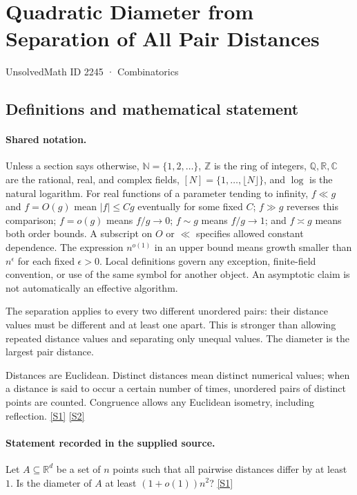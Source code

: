 \documentclass[11pt,a4paper]{article}
\newcommand{\N}{\mathbb{N}}
\newcommand{\Z}{\mathbb{Z}}
\newcommand{\Q}{\mathbb{Q}}
\newcommand{\R}{\mathbb{R}}
\newcommand{\C}{\mathbb{C}}
\newcommand{\sref}[2]{\hyperlink{source:#1:#2}{[S#2]}}
\begin{document}

\setcounter{section}{2244}

\section{Quadratic Diameter from Separation of All Pair Distances}\label{2245}

{\small\sffamily UnsolvedMath ID 2245 · Combinatorics}

\subsection{Definitions and mathematical statement}

\paragraph{Shared notation.}Unless a section says otherwise, $\N=\{1,2,\ldots\}$,
$\Z$ is the ring of integers, $\Q,\R,\C$ are the rational, real, and complex
fields, $[N]=\{1,\ldots,\lfloor N\rfloor\}$, and $\log$ is the natural
logarithm. For real functions of a parameter tending to infinity,
$f\ll g$ and $f=O(g)$ mean $|f|\leq Cg$ eventually for some fixed $C$;
$f\gg g$ reverses this comparison; $f=o(g)$ means $f/g\to0$;
$f\sim g$ means $f/g\to1$; and $f\asymp g$ means both order bounds.
A subscript on $O$ or $\ll$ specifies allowed constant dependence.
The expression $n^{o(1)}$ in an upper bound means growth smaller than
$n^\epsilon$ for each fixed $\epsilon>0$. Local definitions govern any
exception, finite-field convention, or use of the same symbol for another
object. An asymptotic claim is not automatically an effective algorithm.



The separation applies to every two different unordered pairs: their distance values must be different and at least one apart. This is stronger than allowing repeated distance values and separating only unequal values. The diameter is the largest pair distance.

Distances are Euclidean. Distinct distances mean distinct numerical values; when a distance is said to occur a certain number of times, unordered pairs of distinct points are counted. Congruence allows any Euclidean isometry, including reflection. \sref{2245}{1} \sref{2245}{2}

\paragraph{Statement recorded in the supplied source.}
Let $A\subseteq \mathbb{R}^d$ be a set of $n$ points such that all pairwise distances differ by at least $1$. Is the diameter of $A$ at least $(1+o(1))n^2$? \sref{2245}{1}
\end{document}

